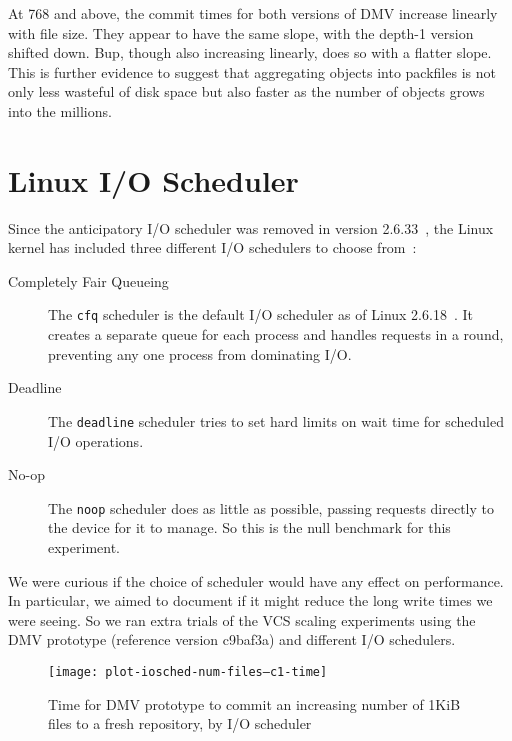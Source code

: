 At \SI{768}{\mib} and above, the commit times for both versions of DMV increase
linearly with file size. They appear to have the same slope, with the
depth-\num{1} version shifted down. Bup, though also increasing linearly, does
so with a flatter slope. This is further evidence to suggest that aggregating
objects into \glspl{packfile} is not only less wasteful of disk space but also
faster as the number of objects grows into the millions.

%
\tweak{\clearpage}


\section{Linux I/O Scheduler}

Since the anticipatory I/O scheduler was removed in version
2.6.33~\cite{as_removed_linux_release_notes}, the Linux kernel has included
three different I/O schedulers to choose from~\cite{ioschedulers}:

\begin{description}

    \item[Completely Fair Queueing] The \lstinline{cfq} scheduler is the default
        I/O scheduler as of Linux 2.6.18~\cite{cfq_default_linux_release_notes}.
        It creates a separate queue for each process and handles requests in a
        round, preventing any one process from dominating I/O.

    \item[Deadline] The \lstinline{deadline} scheduler tries to set hard limits
        on wait time for scheduled I/O operations.

    \item[No-op] The \lstinline{noop} scheduler does as little as possible,
        passing requests directly to the device for it to manage. So this is the
        null benchmark for this experiment.

\end{description}

We were curious if the choice of scheduler would have any effect on performance.
In particular, we aimed to document if it might reduce the long write times we
were seeing. So we ran extra trials of the VCS scaling experiments using the
\gls{DMV} prototype (reference version c9baf3a) and different I/O schedulers.

\begin{figure}[]
    \caption{Time for DMV prototype to commit an increasing number of 1KiB files
    to a fresh repository, by I/O scheduler}
    \label{fig:plot-iosched-num-files--c1-time}
    \centering

    \explainlogsubfig

    \texttt{[image: plot-iosched-num-files--c1-time]}
\end{figure}

